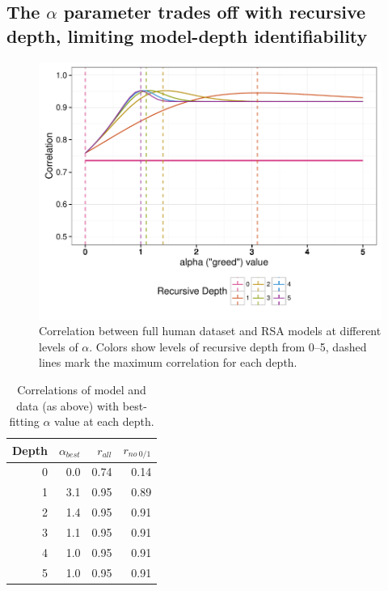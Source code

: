 \documentclass[man]{apa6}
\begin{document}
\subsection{The $\alpha$ parameter trades off with recursive depth, limiting model-depth identifiability}

\begin{figure}[t]
 \centering
 \includegraphics[width=5in]{../plots/alpha-fit.pdf}
 \caption{\label{fig:alpha-fit} Correlation between full human dataset and RSA models at different levels of $\alpha$. Colors show levels of recursive depth from 0--5, dashed lines mark the maximum correlation for each depth.}
\end{figure}

\begin{table}[ht]
\centering
\begin{tabular}{rrrr}
  \hline
Depth & $\alpha_{best}$ & $r_{all}$ & $r_{no~0/1}$ \\
  \hline
  0 & 0.0 & 0.74 & 0.14 \\
    1 & 3.1 & 0.95 & 0.89 \\
    2 & 1.4 & 0.95 & 0.91 \\
    3 & 1.1 & 0.95 & 0.91 \\
    4 & 1.0 & 0.95 & 0.91 \\
    5 & 1.0 & 0.95 & 0.91 \\
   \hline
\end{tabular}
\caption{\label{tab:corrs-fita} Correlations of model and data (as above) with best-fitting $\alpha$ value at each depth.}
\end{table}
\end{document}
